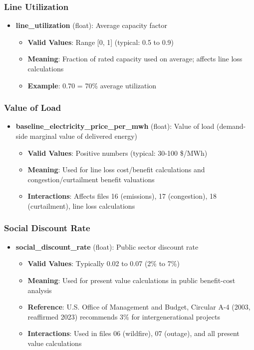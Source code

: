\documentclass[ctcc_full_documentation.tex]{subfiles}
\begin{document}
\subsubsection{Line Utilization}

\begin{itemize}
    \item \textbf{line\_utilization} (float): Average capacity factor
    \begin{itemize}
        \item \textbf{Valid Values}: Range [0, 1] (typical: 0.5 to 0.9)
        \item \textbf{Meaning}: Fraction of rated capacity used on average; affects line loss calculations
        \item \textbf{Example}: 0.70 = 70\% average utilization
    \end{itemize}
\end{itemize}

\subsubsection{Value of Load}

\begin{itemize}
    \item \textbf{baseline\_electricity\_price\_per\_mwh} (float): Value of load (demand-side marginal value of delivered energy)
    \begin{itemize}
        \item \textbf{Valid Values}: Positive numbers (typical: 30-100 \$/MWh)
        \item \textbf{Meaning}: Used for line loss cost/benefit calculations and congestion/curtailment benefit valuations
        \item \textbf{Interactions}: Affects files 16 (emissions), 17 (congestion), 18 (curtailment), line loss calculations
    \end{itemize}
\end{itemize}

\subsubsection{Social Discount Rate}

\begin{itemize}
    \item \textbf{social\_discount\_rate} (float): Public sector discount rate
    \begin{itemize}
        \item \textbf{Valid Values}: Typically 0.02 to 0.07 (2\% to 7\%)
        \item \textbf{Meaning}: Used for present value calculations in public benefit-cost analysis
        \item \textbf{Reference}: U.S. Office of Management and Budget, Circular A-4 (2003, reaffirmed 2023) recommends 3\% for intergenerational projects
        \item \textbf{Interactions}: Used in files 06 (wildfire), 07 (outage), and all present value calculations
    \end{itemize}
\end{itemize}
\end{document}
